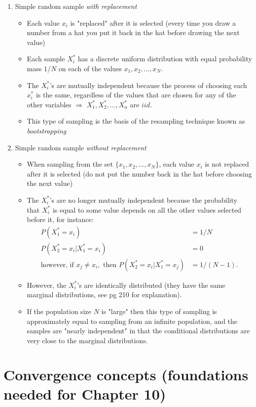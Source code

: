 \documentclass[11pt,]{article}
\begin{document}
\begin{enumerate}
\item Simple random sample {\em with replacement}
\begin{itemize}
\item Each value $x_i$ is "replaced" after it is selected (every time you draw a number from a hat you put it back in the hat before drawing the next value)
\item Each sample $X^*_i$ has a discrete uniform distribution with equal probability mass $1/N$ on each of the values $x_1, x_2, \ldots, x_N$.
\item The $X^*_i$'s are mutually independent because the process of choosing each $x^*_i$ is the same, regardless of the values that are chosen for any of the other variables $\Rightarrow$ $X^*_1, X^*_2, \ldots, X^*_n$ are $iid$.
\item This type of sampling is the basis of the resampling technique known as {\em bootstrapping}
\end{itemize}
\item Simple random sample {\em without replacement}
\begin{itemize}
\item When sampling from the set $\{x_1, x_2, \ldots, x_N\}$, each value $x_i$ is not replaced after it is selected (do not put the number back in the hat before choosing the next value)
\item The $X^*_i$'s are no longer mutually independent because the probability that $X^*_i$ is equal to some value depends on all the other values selected before it, for instance:
  \begin{align*}
P(X^*_1 = x_i) &= 1/N\\
P(X^*_2 = x_i | X^*_1=x_i) &= 0\\
\mbox{however, if } x_j \neq x_i, \mbox{ then } P(X^*_2 = x_i | X^*_1=x_j) &= 1/(N-1).
\end{align*}
\item However, the $X^*_i$'s are identically distributed (they have the same marginal distributions, see pg 210 for explanation).
\item If the population size $N$ is "large" then this type of sampling is approximately equal to sampling from an infinite population, and the samples are "nearly independent" in that the conditional distributions are very close to the marginal distributions.
\end{itemize}
\end{enumerate}

\hypertarget{convergence-concepts-foundations-needed-for-chapter-10}{%
\section{Convergence concepts (foundations needed for Chapter
10)}\label{convergence-concepts-foundations-needed-for-chapter-10}}
\end{document}
